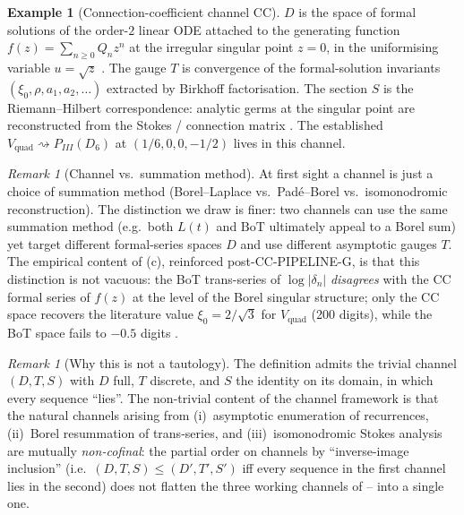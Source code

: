 \documentclass[11pt,reqno]{amsart}
\theoremstyle{plain}
\theoremstyle{definition}
\newtheorem{example}[theorem]{Example}
\theoremstyle{remark}
\newtheorem{remark}[theorem]{Remark}
\newcommand{\Lt}{L(t)}
\newcommand{\BoT}{\mathrm{BoT}}
\newcommand{\CC}{\mathrm{CC}}
\newcommand{\Vquad}{V_{\mathrm{quad}}}
\newcommand{\dn}{\delta_{n}}
\begin{document}
\begin{example}[Connection-coefficient channel $\CC$]
\label{ex:cc}
$D$ is the space of formal solutions of the order-$2$ linear
ODE attached to the generating function
$f(z) = \sum_{n \ge 0} Q_n z^n$ at the irregular singular
point $z=0$, in the uniformising variable $u = \sqrt z$
\cite{siarc_cc_pipeline_g}. The gauge $T$ is convergence of
the formal-solution invariants
$(\xi_0, \rho, a_1, a_2, \ldots)$ extracted by Birkhoff
factorisation. The section $S$ is the Riemann--Hilbert
correspondence: analytic germs at the singular point are
reconstructed from the Stokes / connection matrix
\cite{lodayrichaud2016divergent, boalch2001stokes}. The
established $\Vquad \rightsquigarrow P_{III}(D_6)$ at
$(1/6,0,0,-1/2)$ \cite{iwasaki1991from, ohyama2006studies}
lives in this channel.
\end{example}

\begin{remark}[Channel vs.\ summation method]
\label{rem:channel-vs-sum}
At first sight a channel is just a choice of summation method
(Borel--Laplace vs.\ Pad\'e--Borel vs.\ isomonodromic
reconstruction). The distinction we draw is finer: two
channels can use the same summation method (e.g.\ both $\Lt$
and $\BoT$ ultimately appeal to a Borel sum) yet target
different formal-series spaces $D$ and use different
asymptotic gauges $T$. The empirical content of
(c), reinforced post-CC-PIPELINE-G, is
that this distinction is not vacuous: the BoT trans-series of
$\log|\dn|$ \emph{disagrees} with the $\CC$ formal series of
$f(z)$ at the level of the Borel singular structure; only the
$\CC$ space recovers the literature value $\xi_0 = 2/\sqrt 3$
for $\Vquad$ (200 digits), while the BoT space fails to
$-0.5$ digits \cite{siarc_cc_pipeline_f}.
\end{remark}

\begin{remark}[Why this is not a tautology]
\label{rem:not-tautology}
The definition admits the trivial channel $(D,T,S)$ with $D$
full, $T$ discrete, and $S$ the identity on its domain, in
which every sequence ``lies''. The non-trivial content of
the channel framework is that the natural channels arising
from (i)~asymptotic enumeration of recurrences, (ii)~Borel
resummation of trans-series, and (iii)~isomonodromic Stokes
analysis are mutually \emph{non-cofinal}: the partial order
on channels by ``inverse-image inclusion'' (i.e.\
$(D,T,S) \le (D',T',S')$ iff every sequence in the first
channel lies in the second) does not flatten the three
working channels of -- into a
single one.
\end{remark}
\end{document}
